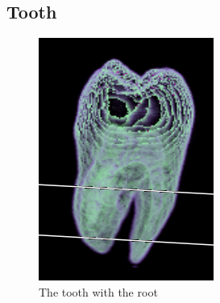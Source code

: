 \documentclass[a4paper,twoside,11pt]{article}
\begin{document}
 \subsection{Tooth}
 \begin{figure}[H]
 
  \includegraphics[width=\linewidth]{images/toothOp}
  \caption{The tooth with the root}\label{toothOp}
\endminipage\hfill
{}

\end{figure}
\end{document}
